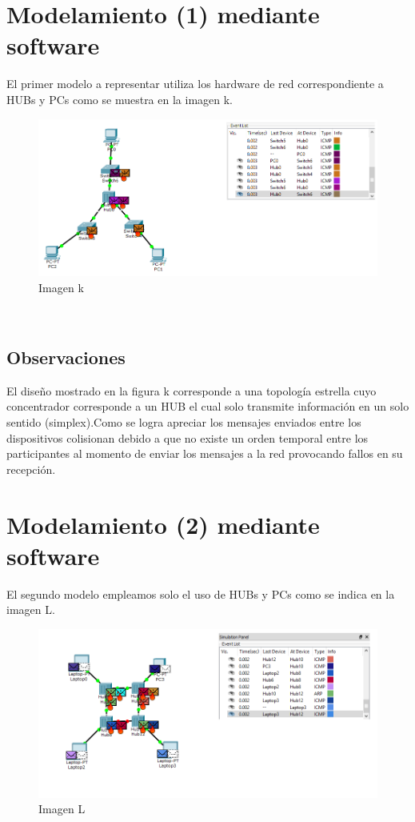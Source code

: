 \documentclass[spanish]{udpreport}
\begin{document}
\section{Modelamiento (1) mediante software}
El primer modelo a representar utiliza los hardware de red correspondiente a HUBs y PCs como se muestra en la imagen k.
\begin{figure}
    \centering
    \includegraphics[scale=0.3]{images/ejemplo1.png}
    \caption{Imagen k}
    \label{fig:my_label}
\end{figure}
\\
\subsection{Observaciones}
El diseño mostrado en la figura k corresponde  a una topología estrella cuyo concentrador corresponde a un HUB el cual solo transmite información en un solo sentido (simplex).Como se logra apreciar los mensajes enviados entre los dispositivos colisionan debido a que no existe un orden temporal entre los participantes al momento de enviar los mensajes a la red provocando fallos en su recepción.
\\
\section{Modelamiento (2) mediante software}
El segundo modelo empleamos solo el uso de HUBs y PCs como se indica en la imagen L.
\\
\begin{figure}[h]
    \centering
    \includegraphics[scale=0.3]{images/EJEMPLO2 LIS.png}
    \caption{Imagen L}
    \label{fig:my_label}
\end{figure}
\end{document}
